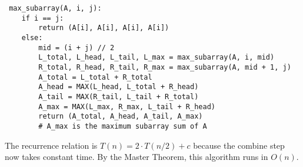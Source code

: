 \documentclass{article}
\begin{document}
\begin{enumerate}
\begin{enumerate}
\begin{enumerate}
\begin{verbatim}
 max_subarray(A, i, j):
    if i == j:
        return (A[i], A[i], A[i], A[i])
    else:
        mid = (i + j) // 2
        L_total, L_head, L_tail, L_max = max_subarray(A, i, mid)
        R_total, R_head, R_tail, R_max = max_subarray(A, mid + 1, j)
        A_total = L_total + R_total
        A_head = MAX(L_head, L_total + R_head)
        A_tail = MAX(R_tail, L_tail + R_total)
        A_max = MAX(L_max, R_max, L_tail + R_head)
        return (A_total, A_head, A_tail, A_max)
        # A_max is the maximum subarray sum of A
            \end{verbatim}
            The recurrence relation is $T(n) = 2\cdot T(n/2) + c$ because the combine step now takes constant time. By the Master Theorem, this algorithm runs in $O(n)$.
        \end{enumerate}
    \end{enumerate}
\end{enumerate}
\end{document}
